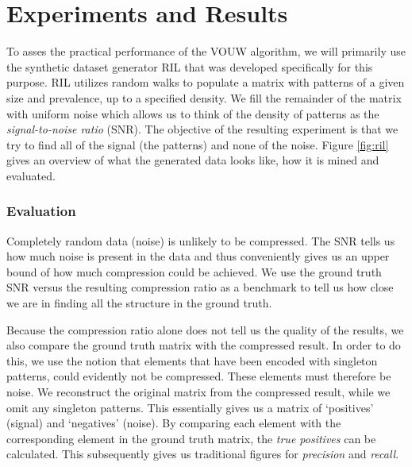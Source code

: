\documentclass{llncs}
\begin{document}
\section{Experiments and Results}

To asses the practical performance of the VOUW algorithm, we will primarily use the synthetic dataset generator RIL that was developed specifically for this purpose. RIL utilizes random walks to populate a matrix with patterns of a given size and prevalence, up to a specified density. We fill the remainder of the matrix with uniform noise which allows us to think of the density of patterns as the \emph{signal-to-noise ratio} (SNR). The objective of the resulting experiment is that we try to find all of the signal (the patterns) and none of the noise. Figure \ref{fig:ril} gives an overview of what the generated data looks like, how it is mined and evaluated.

\subsubsection{Evaluation}

Completely random data (noise) is unlikely to be compressed. The SNR tells us how much noise is present in the data and thus conveniently gives us an upper bound of how much compression could be achieved. We use the ground truth SNR versus the resulting compression ratio as a benchmark to tell us how close we are in finding all the structure in the ground truth. 

Because the compression ratio alone does not tell us the quality of the results, we also compare the ground truth matrix with the compressed result. In order to do this, we use the notion that elements that have been encoded with singleton patterns, could evidently not be compressed. These elements must therefore be noise. We reconstruct the original matrix from the compressed result, while we omit any singleton patterns. This essentially gives us a matrix of `positives' (signal) and `negatives' (noise). By comparing each element with the corresponding element in the ground truth matrix, the \emph{true positives} can be calculated. This subsequently gives us traditional figures for \emph{precision} and \emph{recall}.
\end{document}
